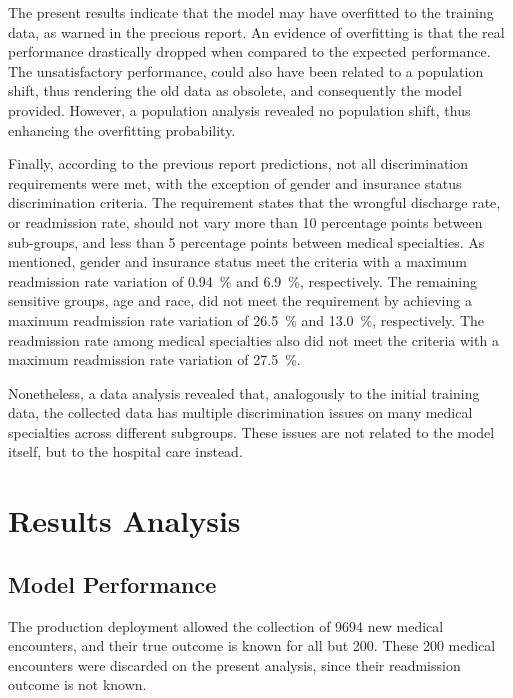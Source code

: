 \documentclass[a4paper,11pt]{article}
\begin{document}
The present results indicate that the model may have overfitted to the training data, as warned in the precious report. An evidence of overfitting is that the real performance drastically dropped when compared to the expected performance.
The unsatisfactory performance, could also have been related to a population shift, thus rendering the old data as obsolete, and consequently the model provided. However, a population analysis revealed no population shift, thus enhancing the overfitting probability.

Finally, according to the previous report predictions, not all discrimination requirements were met, with the exception of gender and insurance status discrimination criteria.%
The requirement states that the wrongful discharge rate, or readmission rate, should not vary more than 10 percentage points between sub-groups, and less than 5 percentage points between medical specialties.
As mentioned, gender and insurance status meet the criteria with a maximum readmission rate variation of \SI{0.94}{\percent} and \SI{6.9}{\percent}, respectively. The remaining sensitive groups, age and race, did not meet the requirement by achieving a maximum readmission rate variation of \SI{26.5}{\percent} and \SI{13.0}{\percent}, respectively.
The readmission rate among medical specialties also did not meet the criteria with a maximum readmission rate variation of \SI{27.5}{\percent}.

Nonetheless, a data analysis revealed that, analogously to the initial training data, the collected data has multiple discrimination issues on many medical specialties across different subgroups. These issues are not related to the model itself, but to the hospital care instead.



\newpage
\section{Results Analysis}
\subsection{Model Performance}

The production deployment allowed the collection of \SI{9694}{} new medical encounters, and their true outcome is known for all but \SI{200}{}. 
These \SI{200}{} medical encounters were discarded on the present analysis, since their readmission outcome is not known.
\end{document}
